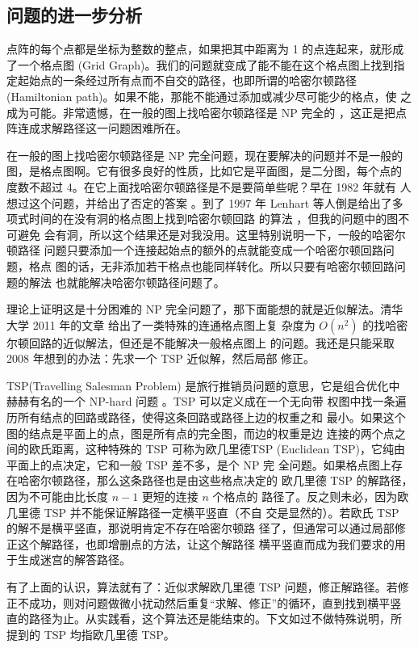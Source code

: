 \documentclass[cs4size,a4paper,adobefonts]{ctexart}
\begin{document}
\subsection{问题的进一步分析}

点阵的每个点都是坐标为整数的整点，如果把其中距离为 1 的点连起来，就形成
了一个格点图 (Grid Graph)。我们的问题就变成了能不能在这个格点图上找到指
定起始点的一条经过所有点而不自交的路径，也即所谓的哈密尔顿路径
(Hamiltonian path)。如果不能，那能不能通过添加或减少尽可能少的格点，使
之成为可能。非常遗憾，在一般的图上找哈密尔顿路径是 NP 完全的
\cite{Garey:1979:CIG:578533}，这正是把点阵连成求解路径这一问题困难所在。

在一般的图上找哈密尔顿路径是 NP 完全问题，现在要解决的问题并不是一般的
图，是格点图啊。它有很多良好的性质，比如它是平面图，是二分图，每个点的
度数不超过 4。在它上面找哈密尔顿路径是不是要简单些呢？早在 1982 年就有
人想过这个问题，并给出了否定的答案 \cite{citeulike:1905588}。到了 1997
年 Lenhart 等人倒是给出了多项式时间的在没有洞的格点图上找到哈密尔顿回路
的算法 \cite{Lenhart:1997:HCS:795663.796334}，但我的问题中的图不可避免
会有洞，所以这个结果还是对我没用。这里特别说明一下，一般的哈密尔顿路径
问题只要添加一个连接起始点的额外的点就能变成一个哈密尔顿回路问题，格点
图的话，无非添加若干格点也能同样转化。所以只要有哈密尔顿回路问题的解法
也就能解决哈密尔顿路径问题了。

理论上证明这是十分困难的 NP 完全问题了，那下面能想的就是近似解法。清华
大学 2011 年的文章 \cite{Zhang20115340} 给出了一类特殊的连通格点图上复
杂度为 $O(n^2)$ 的找哈密尔顿回路的近似解法，但还是不能解决一般格点图上
的问题。我还是只能采取 2008 年想到的办法：先求一个 TSP 近似解，然后局部
修正。

TSP(Travelling Salesman Problem) 是旅行推销员问题的意思，它是组合优化中
赫赫有名的一个 NP-hard 问题 \cite{wiki:TSP}。TSP 可以定义成在一个无向带
权图中找一条遍历所有结点的回路或路径，使得这条回路或路径上边的权重之和
最小。如果这个图的结点是平面上的点，图是所有点的完全图，而边的权重是边
连接的两个点之间的欧氏距离，这种特殊的 TSP 可称为欧几里德TSP
(Euclidean TSP)，它纯由平面上的点决定，它和一般 TSP 差不多，是个 NP 完
全问题。如果格点图上存在哈密尔顿路径，那么这条路径也是由这些格点决定的
欧几里德 TSP 的解路径，因为不可能由比长度 $n-1$ 更短的连接 $n$ 个格点的
路径了。反之则未必，因为欧几里德 TSP 并不能保证解路径一定横平竖直（不自
  交是显然的）。若欧氏 TSP 的解不是横平竖直，那说明肯定不存在哈密尔顿路
径了，但通常可以通过局部修正这个解路径，也即增删点的方法，让这个解路径
横平竖直而成为我们要求的用于生成迷宫的解答路径。

有了上面的认识，算法就有了：近似求解欧几里德 TSP 问题，修正解路径。若修
正不成功，则对问题做微小扰动然后重复“求解、修正”的循环，直到找到横平竖
直的路径为止。从实践看，这个算法还是能结束的。下文如过不做特殊说明，所
提到的 TSP 均指欧几里德 TSP。
\end{document}
